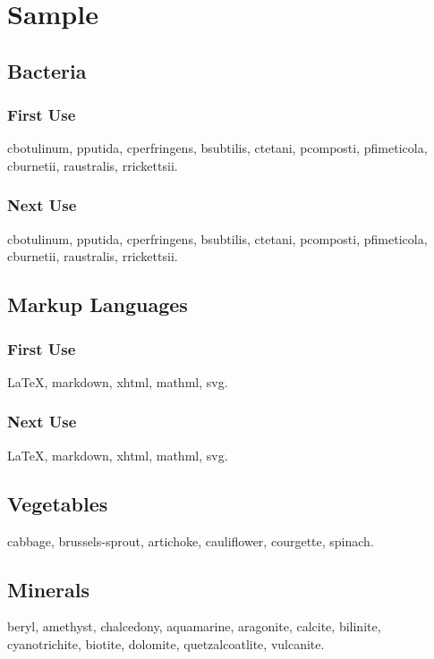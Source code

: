 \documentclass{scrreprt}
\begin{document}
\chapter{Sample}
\section{Bacteria}
\subsection{First Use}
\gls{cbotulinum}, \gls{pputida}, \gls{cperfringens},
\gls{bsubtilis}, \gls{ctetani}, \gls{pcomposti},
\gls{pfimeticola}, \gls{cburnetii}, \gls{raustralis},
\gls{rrickettsii}.

\subsection{Next Use}
\gls{cbotulinum}, \gls{pputida}, \gls{cperfringens},
\gls{bsubtilis}, \gls{ctetani}, \gls{pcomposti},
\gls{pfimeticola}, \gls{cburnetii}, \gls{raustralis},
\gls{rrickettsii}.

\section{Markup Languages}
\subsection{First Use}
\gls{LaTeX}, \gls{markdown}, \gls{xhtml}, \gls{mathml}, \gls{svg}.

\subsection{Next Use}
\gls{LaTeX}, \gls{markdown}, \gls{xhtml}, \gls{mathml}, \gls{svg}.

\section{Vegetables}
\gls{cabbage}, \gls{brussels-sprout}, \gls{artichoke}, 
\gls{cauliflower}, \gls{courgette}, \gls{spinach}.

\section{Minerals}
\Gls{beryl}, \gls{amethyst}, \gls{chalcedony}, \gls{aquamarine},
\gls{aragonite}, \gls{calcite}, \gls{bilinite}, \gls{cyanotrichite},
\gls{biotite}, \gls{dolomite}, \gls{quetzalcoatlite}, \gls{vulcanite}.
\end{document}
